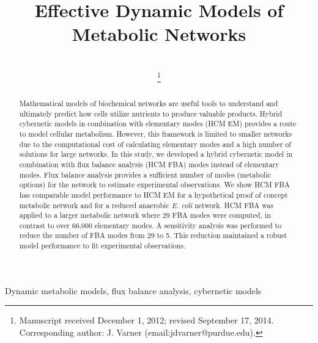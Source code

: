 \documentclass[10pt,twocolumn,twoside,final]{IEEEtran}
\begin{document}
\title{Effective Dynamic Models of Metabolic Networks}


\author{\\
\thanks{Manuscript received December 1, 2012; revised September 17, 2014.
Corresponding author: J. Varner (email:jdvarner@purdue.edu).}}

\maketitle

\begin{abstract}
Mathematical models of biochemical networks are useful tools to understand and ultimately predict how cells utilize nutrients to produce valuable products.
Hybrid cybernetic models in combination with elementary modes (HCM EM) provides a route to model cellular metabolism.
However, this framework is limited to smaller networks due to the computational cost of calculating elementary modes and a high number of solutions for large networks.
In this study, we developed a hybrid cybernetic model in combination with flux balance analysis (HCM FBA) modes instead of elementary modes.
Flux balance analysis provides a sufficient number of modes (metabolic options) for the network to estimate experimental observations.
We show HCM FBA has comparable model performance to HCM EM for a hypothetical proof of concept metabolic network and for a reduced anaerobic \textit{E. coli} network.
HCM FBA was applied to a larger metabolic network where 29 FBA modes were computed, in contrast to over 66,000 elementary modes.  A sensitivity analysis was performed to reduce the number of FBA modes from 29 to 5. This reduction maintained a robust model performance to fit experimental observations.

\end{abstract}


\begin{IEEEkeywords}
Dynamic metabolic models, flux balance analysis, cybernetic models
\end{IEEEkeywords}
\end{document}
